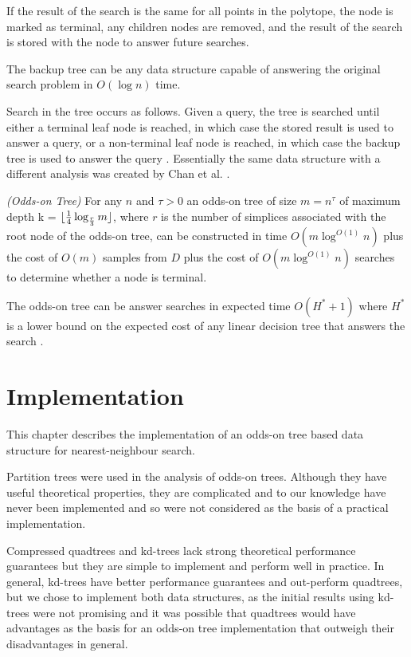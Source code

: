 \documentclass[mcs]{scsthesis}
\begin{document}
If the result of the search is the same for all points in the polytope, the node
is marked as terminal, any children nodes are removed, and the result of the
search is stored with the node to answer future searches.

The backup tree can be any data structure capable of answering the original
search problem in \(O(\log n)\) time.

Search in the tree occurs as follows. Given a query, the tree is searched until
either a terminal leaf node is reached, in which case the stored result is used
to answer a query, or a non-terminal leaf node is reached, in which case the
backup tree is used to answer the query \cite{oddson}. Essentially the same data
structure with a different analysis was created by Chan et al. \cite{chan}.

\begin{thm} \emph{(Odds-on Tree)}
For any \(n\) and \(\tau>0\) an odds-on tree of size \(m = n^\tau\) of maximum
depth k = \(\lfloor {1 \over 4} \log_{r \over 3} m \rfloor \), where \(r\) is
the number of simplices associated with the root node of the odds-on tree, can
be constructed in time \(O(m \log^{O(1)} n)\) plus the cost of \(O(m)\) samples
from \(D\) plus the cost of \(O(m \log^{O(1)} n)\) searches to determine whether
a node is terminal.

The odds-on tree can be answer searches in expected time \(O(H^* + 1)\) where
\(H^*\) is a lower bound on the expected cost of any linear decision tree
that answers the search \cite{oddson}.  
\end{thm}

\chapter{Implementation}

This chapter describes the implementation of an odds-on tree based data
structure for nearest-neighbour search.

Partition trees were used in the analysis of odds-on trees. Although they have
useful theoretical properties, they are complicated and to our knowledge have
never been implemented and so were not considered as the basis of a practical
implementation.

Compressed quadtrees and kd-trees lack strong theoretical performance
guarantees but they are simple to implement and perform well in practice. In
general, kd-trees have better performance guarantees and out-perform quadtrees,
but we chose to implement both data structures, as the initial results using
kd-trees were not promising and it was possible that quadtrees would have
advantages as the basis for an odds-on tree implementation that outweigh their
disadvantages in general. 
\end{document}

